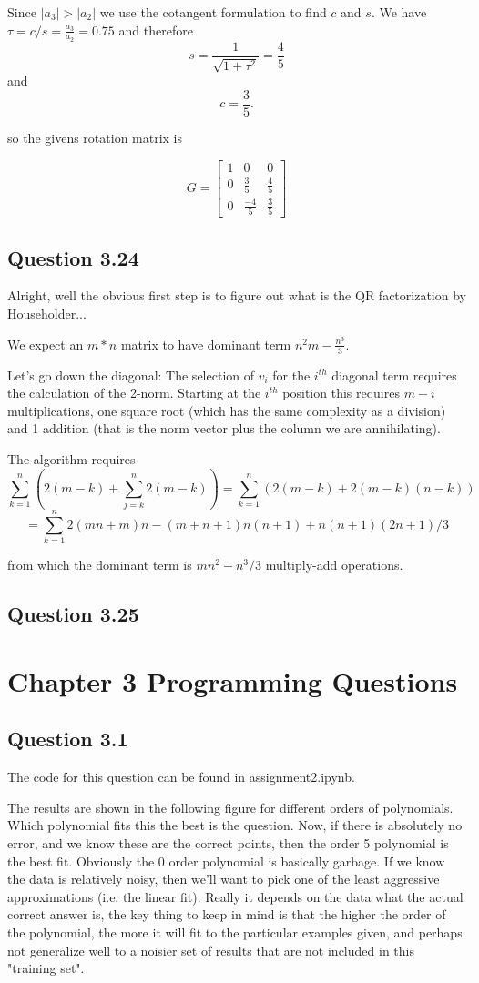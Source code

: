 \documentclass[12pt,a4paper]{report}
\begin{document}
Since $\lvert a_3 \rvert > \lvert a_2 \rvert$ we use the cotangent formulation
to find $c$ and $s$. We have $\tau = c / s = \frac{a_3}{a_2} = 0.75$ and
therefore
$$s = \frac{1}{\sqrt{1+ \tau^2}} =\frac{4}{5}$$
and
$$c = \frac{3}{5}.$$

so the givens rotation matrix is

{\color{blue}
$$G = \begin{bmatrix}
1&0&0\\
0&\frac{3}{5}&\frac{4}{5}\\
0&\frac{-4}{5}&\frac{3}{5}
\end{bmatrix}
$$
}

\subsection*{Question 3.24}
Alright, well the obvious first step is to figure
out what is the QR factorization by Householder...

We expect an $m*n$ matrix to have dominant term
$n^2m-\frac{n^3}{3}$.

Let's go down the diagonal:
The selection of $v_i$ for the $i^{th}$ diagonal
term requires the calculation of the 2-norm.
Starting at the $i^{th}$ position this requires
$m-i$ multiplications, one square root (which
has the same complexity as a division) and 1
addition (that is the norm vector plus the column
we are annihilating).

The algorithm requires
$$\sum_{k=1}^{n}(2(m-k)+\sum_{j=k}^{n}2(m-k))
=\sum_{k=1}^{n}(2(m-k)+2(m-k)(n-k))$$
$$=\sum_{k=1}^{n}2(mn+m)n-(m+n+1)n(n+1) +
n(n+1)(2n+1)/3$$

from which the dominant term is $mn^2-n^3/3$
multiply-add operations.

{\color{red}
\subsection*{Question 3.25}
}
\section*{Chapter 3 Programming Questions}
\subsection*{Question 3.1}
The code for this question can be found in
assignment2.ipynb.

The results are shown in the following figure for different orders of polynomials. Which polynomial
fits this the best is the question. Now, if there
is absolutely no error, and we know these are
the correct points, then the order 5 polynomial
is the best fit. Obviously the 0 order polynomial
is basically garbage. If we know the data is
relatively noisy, then we'll want to pick one
of the least aggressive approximations (i.e. the
linear fit). Really it depends on the data what
the actual correct answer is, the key thing to
keep in mind is that the higher the order
of the polynomial, the more it will fit to the
particular examples given, and perhaps not
generalize well to a noisier set of results
that are not included in this "training set".
\end{document}
